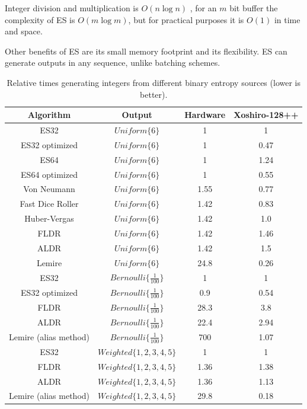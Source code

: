 \documentclass[12pt]{article}
\begin{document}
Integer division and multiplication is $O(n \log n)$ \cite{harvey2021integer}, for an $m$ bit buffer the complexity of ES is $O(m \log m)$, but for practical purposes it is $O(1)$ in time and space.

Other benefits of ES are its small memory footprint and its flexibility. ES can generate outputs in any sequence, unlike batching schemes.

\begin{table}[h!]
\centering
\begin{tabular}{|c|c|c|c|}
\hline
Algorithm & Output & Hardware & Xoshiro-128++ \\
\hline
ES32                  & $Uniform\{6\}$ & 1 & 1 \\
ES32 optimized        & $Uniform\{6\}$ & 1 & 0.47 \\
ES64                  & $Uniform\{6\}$ & 1 & 1.24 \\
ES64 optimized        & $Uniform\{6\}$ & 1 & 0.55 \\
Von Neumann \cite{neumann51}     & $Uniform\{6\}$ & 1.55 & 0.77 \\
Fast Dice Roller \cite{lumbroso2013optimal} & $Uniform\{6\}$ & 1.42 & 0.83 \\
Huber-Vergas \cite{huber2024optimalrollingfairdice} & $Uniform\{6\}$ & 1.42 & 1.0 \\
FLDR \cite{saad2020fldr} & $Uniform\{6\}$ & 1.42 & 1.46 \\
ALDR \cite{saad2025} & $Uniform\{6\}$ & 1.42 & 1.5 \\
Lemire \cite{lemire2019fast} & $Uniform\{6\}$ & 24.8 & 0.26 \\
\hline

ES32                  & $Bernoulli\{\frac{1}{100}\}$ & 1 & 1 \\
ES32 optimized        & $Bernoulli\{\frac{1}{100}\}$ & 0.9 & 0.54 \\
FLDR                  & $Bernoulli\{\frac{1}{100}\}$ & 28.3 & 3.8 \\
ALDR                  & $Bernoulli\{\frac{1}{100}\}$ & 22.4 & 2.94 \\
Lemire (alias method) & $Bernoulli\{\frac{1}{100}\}$ & 700 & 1.07 \\

\hline

ES32                  & $Weighted\{1,2,3,4,5\}$ & 1 & 1 \\
FLDR                  & $Weighted\{1,2,3,4,5\}$ & 1.36 & 1.38 \\
ALDR                  & $Weighted\{1,2,3,4,5\}$ & 1.36 & 1.13 \\
Lemire (alias method) & $Weighted\{1,2,3,4,5\}$ & 29.8 & 0.18 \\

\hline

\end{tabular}
\caption{Relative times generating integers from different binary entropy sources (lower is better).}
    \label{tab:speed}
\end{table}
\end{document}
